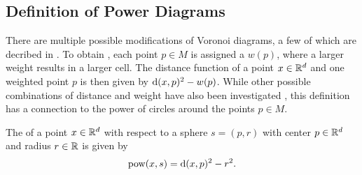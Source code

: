 \subsection{Definition of Power Diagrams}
\label{sub:definition_of_power_diagrams}
There are multiple possible modifications of Voronoi diagrams, a few of which are decribed in \cite{aurenhammer1987power}.
To obtain , each point $p \in M$ is assigned a  $w(p)$, where a larger weight results in a larger cell.
The distance function of a point $x \in \mathbb{R}^d$ and one weighted point $p$ is then given by $\operatorname{d}(x, p)^2 - w(p)$.
While other possible combinations of distance and weight have also been investigated \cite{aurenhammer1987power}, this definition has a connection to the power of circles around the points $p \in M$.

\begin{definition}
    \label{def:power}
    The  of a point $x \in \mathbb{R}^d$ with respect to a sphere $s = (p, r)$ with center $p \in \mathbb{R}^d$ and radius $r \in \mathbb{R}$ is given by
    \begin{align}
        \operatorname{pow}(x, s) = \operatorname{d}(x, p)^2 - r^2.
    \end{align}
\end{definition}
